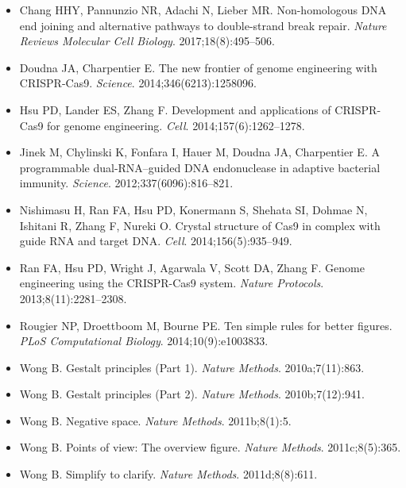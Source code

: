 {\sloppy
\begin{itemize}
\item Chang HHY, Pannunzio NR, Adachi N, Lieber MR. Non-homologous DNA end joining and alternative pathways to double-strand break repair. \emph{Nature Reviews Molecular Cell Biology}. 2017;18(8):495--506. 
\item Doudna JA, Charpentier E. The new frontier of genome engineering with CRISPR-Cas9. \emph{Science}. 2014;346(6213):1258096. 
\item Hsu PD, Lander ES, Zhang F. Development and applications of CRISPR-Cas9 for genome engineering. \emph{Cell}. 2014;157(6):1262--1278. 
\item Jinek M, Chylinski K, Fonfara I, Hauer M, Doudna JA, Charpentier E. A programmable dual-RNA--guided DNA endonuclease in adaptive bacterial immunity. \emph{Science}. 2012;337(6096):816--821. 
\item Nishimasu H, Ran FA, Hsu PD, Konermann S, Shehata SI, Dohmae N, Ishitani R, Zhang F, Nureki O. Crystal structure of Cas9 in complex with guide RNA and target DNA. \emph{Cell}. 2014;156(5):935--949. 
\item Ran FA, Hsu PD, Wright J, Agarwala V, Scott DA, Zhang F. Genome engineering using the CRISPR-Cas9 system. \emph{Nature Protocols}. 2013;8(11):2281--2308. 
\item Rougier NP, Droettboom M, Bourne PE. Ten simple rules for better figures. \emph{PLoS Computational Biology}. 2014;10(9):e1003833. 
\item Wong B. Gestalt principles (Part 1). \emph{Nature Methods}. 2010a;7(11):863. 
\item Wong B. Gestalt principles (Part 2). \emph{Nature Methods}. 2010b;7(12):941. 
\item Wong B. Negative space. \emph{Nature Methods}. 2011b;8(1):5. 
\item Wong B. Points of view: The overview figure. \emph{Nature Methods}. 2011c;8(5):365. 
\item Wong B. Simplify to clarify. \emph{Nature Methods}. 2011d;8(8):611. 
\end{itemize}
\par}
